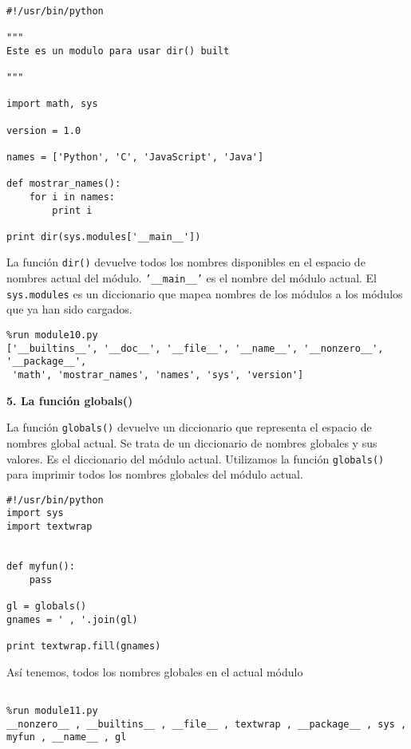 \documentclass[twoside,10.5pt]{article}%
\begin{document}
\begin{verbatim}

#!/usr/bin/python

"""
Este es un modulo para usar dir() built

"""

import math, sys

version = 1.0

names = ['Python', 'C', 'JavaScript', 'Java']

def mostrar_names():
    for i in names:
        print i

print dir(sys.modules['__main__'])
\end{verbatim}

La funci\'on \texttt{dir()}  devuelve todos los nombres disponibles en el espacio de nombres actual del m\'odulo. \texttt{'\_\_main\_\_'} es el nombre del m\'odulo actual. El \texttt{sys.modules} es un diccionario que mapea nombres de los m\'odulos a los m\'odulos que ya han sido cargados.

\begin{verbatim}
%run module10.py
['__builtins__', '__doc__', '__file__', '__name__', '__nonzero__', '__package__',
 'math', 'mostrar_names', 'names', 'sys', 'version']
\end{verbatim}


\vspace{0.3cm}


\textbf{5. La funci\'on globals()}


La funci\'on \texttt{globals()} devuelve un diccionario que representa el espacio de nombres global actual. Se trata de un diccionario de nombres globales y sus valores. Es el diccionario del m\'odulo actual. Utilizamos la función \texttt{globals()} para imprimir todos los nombres globales del m\'odulo actual.


\begin{verbatim}
#!/usr/bin/python
import sys
import textwrap


def myfun():
    pass

gl = globals()
gnames = ' , '.join(gl)

print textwrap.fill(gnames)
\end{verbatim}



As\'i tenemos, todos los nombres globales en el actual m\'odulo


\begin{verbatim}

%run module11.py
__nonzero__ , __builtins__ , __file__ , textwrap , __package__ , sys ,
myfun , __name__ , gl
\end{verbatim}
\end{document}
